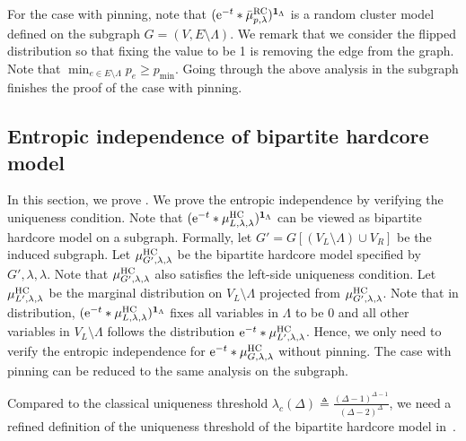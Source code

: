 \documentclass[11pt,a4paper]{article}
\newcommand{\e}{\mathrm{e}}
\theoremstyle{definition}
\newcommand{\defeq}{\triangleq}
\def\*#1{\mathbf{#1}} %
\begin{document}
For the case with pinning, note that $(\e^{-t} * \bar{\mu}_{p,\lambda}^{\textnormal{RC}})^{\*1_\Lambda}$ is a random cluster model defined on the subgraph $G=(V,E\setminus \Lambda)$. We remark that we consider the flipped distribution so that fixing the value to be 1 is removing the edge from the graph. Note that $\min_{e \in E \setminus \Lambda} p_e \geq p_{\min}$. Going through the above analysis in the subgraph finishes the proof of the case with pinning.



\subsection{Entropic independence of bipartite hardcore model}\label{sec:HC-EI-proof}




In this section, we prove . We prove the entropic independence by verifying the uniqueness condition. 
Note that $(\e^{-t} *\mu_{L,\lambda,\lambda}^{\textnormal{HC}})^{\*1_\Lambda}$ can be viewed as bipartite hardcore model on a subgraph. Formally, let $G'=G[(V_L \setminus \Lambda) \cup V_R]$ be the induced subgraph. Let $\mu_{G',\lambda,\lambda}^{\textnormal{HC}}$ be the bipartite hardcore model specified by $G',\lambda,\lambda$.
Note that $\mu_{G',\lambda,\lambda}^{\textnormal{HC}}$  also satisfies the left-side uniqueness condition.
Let $\mu_{L',\lambda,\lambda}^{\textnormal{HC}}$ be the marginal distribution on $V_L \setminus \Lambda$ projected from $\mu_{G',\lambda,\lambda}^{\textnormal{HC}}$. Note that in distribution, $(\e^{-t} *\mu_{L,\lambda,\lambda}^{\textnormal{HC}})^{\*1_\Lambda}$ fixes all variables in $\Lambda$ to be $0$ and all other variables in $V_L \setminus \Lambda$ follows the distribution $\e^{-t} *\mu_{L',\lambda,\lambda}^{\textnormal{HC}}$. Hence, we only need to verify the entropic independence for $\e^{-t}*\mu_{G,\lambda,\lambda}^{\textnormal{HC}}$ without pinning. The case with pinning can be reduced to the same analysis on the subgraph.




Compared to the classical uniqueness threshold $\lambda_c(\Delta)\defeq \frac{(\Delta-1)^{\Delta-1}}{(\Delta-2)^\Delta}$, we need a refined definition of the uniqueness threshold of the bipartite hardcore model in~\cite{Chen0Y23}.
\end{document}
